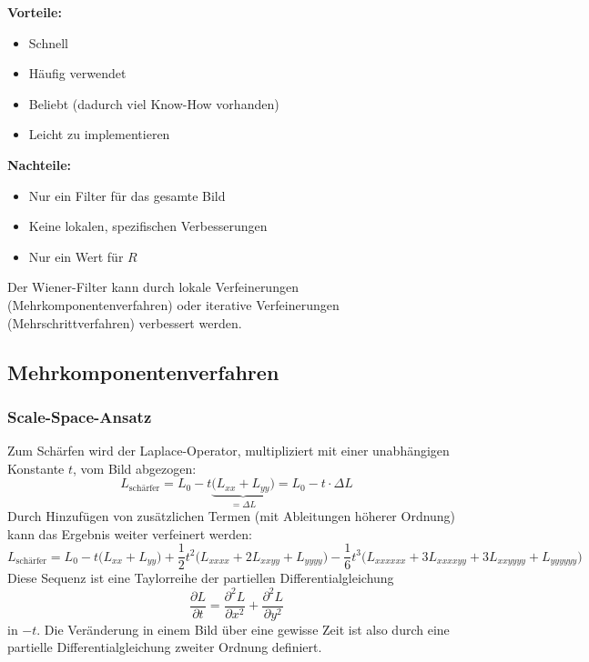 				\textbf{Vorteile:}
				\begin{itemize}
					\item Schnell
					\item Häufig verwendet
					\item Beliebt (dadurch viel Know-How vorhanden)
					\item Leicht zu implementieren
				\end{itemize}
				\textbf{Nachteile:}
				\begin{itemize}
					\item Nur ein Filter für das gesamte Bild
					\item Keine lokalen, spezifischen Verbesserungen
					\item Nur ein Wert für \(R\)
				\end{itemize}
				Der Wiener-Filter kann \zB durch lokale Verfeinerungen (Mehrkomponentenverfahren) oder iterative Verfeinerungen (Mehrschrittverfahren) verbessert werden.

			\subsection{Mehrkomponentenverfahren}
				\subsubsection{Scale-Space-Ansatz}
					Zum Schärfen wird der Laplace-Operator, multipliziert mit einer unabhängigen Konstante \(t\), vom Bild abgezogen:
					\begin{equation*}
						L_\text{schärfer} = L_0 - t \underbrace{\big( L_{xx} + L_{yy} \big)}_{= \Delta L} = L_0 - t \cdot \Delta L
					\end{equation*}
					Durch Hinzufügen von zusätzlichen Termen (mit Ableitungen höherer Ordnung) kann das Ergebnis weiter verfeinert werden:
					\begin{equation*}
						L_\text{schärfer} = L_0 - t \big( L_{xx} + L_{yy} \big) + \frac{1}{2} t^2 \big( L_{xxxx} + 2L_{xxyy} + L_{yyyy} \big) - \frac{1}{6} t^3 \big( L_{xxxxxx} + 3L_{xxxxyy} + 3L_{xxyyyy} + L_{yyyyyy} \big)
					\end{equation*}
					Diese Sequenz ist eine Taylorreihe der partiellen Differentialgleichung
					\begin{equation*}
						\frac{\partial L}{\partial t} = \frac{\partial^2 L}{\partial x^2} + \frac{\partial^2 L}{\partial y^2}
					\end{equation*}
					in \(-t\). Die Veränderung in einem Bild über eine gewisse Zeit ist also durch eine partielle Differentialgleichung zweiter Ordnung definiert.

